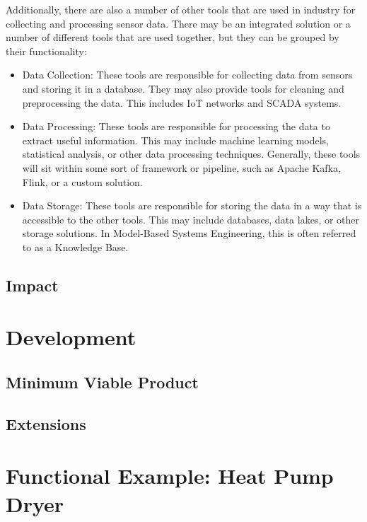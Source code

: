 \documentclass[12pt]{report}
\begin{document}
Additionally, there are also a number of other tools that are used in industry for collecting and processing sensor data. There may be an integrated solution or a number of different tools that are used together, but they can be grouped by their functionality:
\begin{itemize}
    \item Data Collection: These tools are responsible for collecting data from sensors and storing it in a database. They may also provide tools for cleaning and preprocessing the data. This includes IoT networks and SCADA systems.
    \item Data Processing: These tools are responsible for processing the data to extract useful information. This may include machine learning models, statistical analysis, or other data processing techniques. Generally, these tools will sit within some sort of framework or pipeline, such as Apache Kafka, Flink, or a custom solution.
    \item Data Storage: These tools are responsible for storing the data in a way that is accessible to the other tools. This may include databases, data lakes, or other storage solutions. In Model-Based Systems Engineering, this is often referred to as a Knowledge Base.
\end{itemize}





\section{Impact}



\chapter{Development}


\section{Minimum Viable Product}

\section{Extensions}



\chapter{Functional Example: Heat Pump Dryer}
\end{document}
